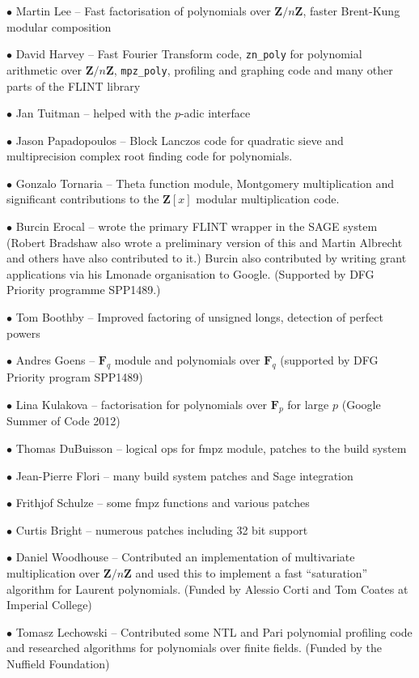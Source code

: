 \documentclass[a4paper,10pt]{book}
\newcommand{\Z}{\mathbf{Z}}%
\newcommand{\F}{\mathbf{F}}%
\newcommand{\code}{\lstinline}
\begin{document}
$\bullet$ Martin Lee -- Fast factorisation of polynomials over $\Z/n\Z$,
faster Brent-Kung modular composition

$\bullet$ David Harvey -- Fast Fourier Transform code, \code{zn_poly} for
polynomial arithmetic over $\Z/n\Z$, \code{mpz_poly}, profiling and
graphing code and many other parts of the FLINT library

$\bullet$ Jan Tuitman -- helped with the $p$-adic interface

$\bullet$ Jason Papadopoulos -- Block Lanczos code for quadratic sieve and
multiprecision complex root finding code for polynomials.

$\bullet$ Gonzalo Tornaria -- Theta function module, Montgomery multiplication
and significant contributions to the $\Z[x]$ modular multiplication code.

$\bullet$ Burcin Erocal -- wrote the primary FLINT wrapper in the SAGE system
(Robert Bradshaw also wrote a preliminary version of this and Martin Albrecht
and others have also contributed to it.)  Burcin also contributed by writing
grant applications via his Lmonade organisation to Google. (Supported by DFG
Priority programme SPP1489.)

$\bullet$ Tom Boothby -- Improved factoring of unsigned longs, detection of
perfect powers

$\bullet$ Andres Goens -- $\F_q$ module and polynomials over $\F_q$ (supported
by DFG Priority program SPP1489)

$\bullet$ Lina Kulakova --  factorisation for polynomials over $\F_p$ for large
$p$ (Google Summer of Code 2012)

$\bullet$ Thomas DuBuisson -- logical ops for fmpz module, patches to the build
system

$\bullet$ Jean-Pierre Flori -- many build system patches and Sage integration

$\bullet$ Frithjof Schulze -- some fmpz functions and various patches

$\bullet$ Curtis Bright -- numerous patches including 32 bit support

$\bullet$ Daniel Woodhouse -- Contributed an implementation of multivariate
multiplication over $\Z/n\Z$ and used this to implement a fast ``saturation''
algorithm for Laurent polynomials. (Funded by Alessio Corti and Tom Coates
at Imperial College)

$\bullet$ Tomasz Lechowski -- Contributed some NTL and Pari polynomial
profiling code and researched algorithms for polynomials over finite fields.
(Funded by the Nuffield Foundation)
\end{document}
